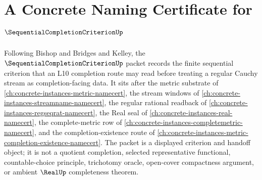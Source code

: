 \chapter{A Concrete Naming Certificate for $\SequentialCompletionCriterionUp$}
\label{ch:concrete-instances-sequential-completion-criterion-namecert}

Following Bishop and Bridges and Kelley, the $\SequentialCompletionCriterionUp$ packet records the finite sequential criterion that an L10 completion route may read before treating a regular Cauchy stream as completion-facing data. It sits after the metric substrate of \autoref{ch:concrete-instances-metric-namecert}, the stream windows of \autoref{ch:concrete-instances-streamname-namecert}, the regular rational readback of \autoref{ch:concrete-instances-regseqrat-namecert}, the Real seal of \autoref{ch:concrete-instances-real-namecert}, the complete-metric row of \autoref{ch:concrete-instances-completemetric-namecert}, and the completion-existence route of \autoref{ch:concrete-instances-metric-completion-existence-namecert}. The packet is a displayed criterion and handoff object; it is not a quotient completion, selected representative functional, countable-choice principle, trichotomy oracle, open-cover compactness argument, or ambient $\RealUp$ completeness theorem.

